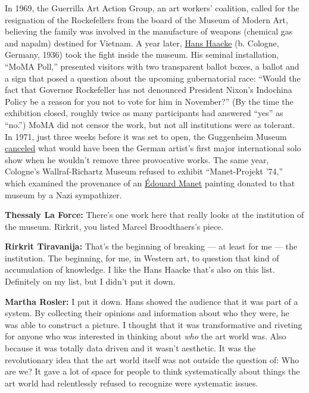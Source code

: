 In 1969, the Guerrilla Art Action Group, an art workers' coalition,
called for the resignation of the Rockefellers from the board of the
Museum of Modern Art, believing the family was involved in the
manufacture of weapons (chemical gas and napalm) destined for Vietnam. A
year later,
\href{https://www.nytimes.com/2014/10/24/arts/design/hans-haacke-gets-establishment-nod-of-approval.html}{Hans
Haacke} (b. Cologne, Germany, 1936) took the fight inside the museum.
His seminal installation, ``MoMA Poll,'' presented visitors with two
transparent ballot boxes, a ballot and a sign that posed a question
about the upcoming gubernatorial race: ``Would the fact that Governor
Rockefeller has not denounced President Nixon's Indochina Policy be a
reason for you not to vote for him in November?'' (By the time the
exhibition closed, roughly twice as many participants had answered
``yes'' as ``no.'') MoMA did not censor the work, but not all
institutions were as tolerant. In 1971, just three weeks before it was
set to open, the Guggenheim Museum
\href{https://www.nytimes.com/1971/04/07/archives/the-guggenheim-cancels-haackes-show.html}{canceled}
what would have been the German artist's first major international solo
show when he wouldn't remove three provocative works. The same year,
Cologne's Wallraf-Richartz Museum refused to exhibit ``Manet-Projekt
'74,'' which examined the provenance of an
\href{https://www.nytimes.com/topic/person/edouard-manet}{Édouard Manet}
painting donated to that museum by a Nazi sympathizer.

\textbf{Thessaly La Force:} There's one work here that really looks at
the institution of the museum. Rirkrit, you listed Marcel Broodthaers's
piece.

\textbf{Rirkrit Tiravanija:} That's the beginning of breaking --- at
least for me --- the institution. The beginning, for me, in Western art,
to question that kind of accumulation of knowledge. I like the Hans
Haacke that's also on this list. Definitely on my list, but I didn't put
it down.

\textbf{Martha Rosler:} I put it down. Hans showed the audience that it
was part of a system. By collecting their opinions and information about
who they were, he was able to construct a picture. I thought that it was
transformative and riveting for anyone who was interested in thinking
about \emph{who} the art world was. Also because it was totally data
driven and it wasn't aesthetic. It was the revolutionary idea that the
art world itself was not outside the question of: Who are we? It gave a
lot of space for people to think systematically about things the art
world had relentlessly refused to recognize were systematic issues.

